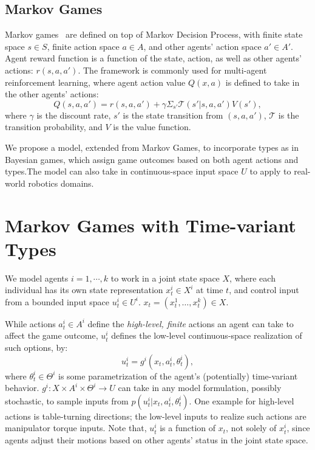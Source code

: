 \documentclass[letterpaper, 10 pt, conference]{ieeeconf}  %
\begin{document}
\subsection{Markov Games}
\vspace{-.2em}
Markov games~\cite{littman1994markov} are defined on top of Markov Decision Process, with finite state space 
$s \in S$, finite action space $a \in A$, and other agents' action space 
$a' \in A'$.  Agent reward 
function is a function of the state, action, as well as other agents' actions: 
$r(s,a,a')$. The framework is commonly used for multi-agent reinforcement 
learning, where agent action value $Q(x,a)$ is defined to take in the other agents' actions:
\begin{equation}
  Q(s,a,a') = r(s,a,a') + \gamma \Sigma_{s'}\mathcal{T}(s'|s,a,a')V(s'),
\end{equation}
where $\gamma$ is the discount rate, $s'$ is the state transition from 
$(s,a,a')$, $\mathcal{T}$ is the transition probability, and $V$ is the value 
function.

We propose a model, extended from Markov Games, to incorporate types as in 
Bayesian games, which assign game outcomes based on both agent actions and 
types.The model can also take in continuous-space input space $U$ to apply to real-world robotics domains. 
\section{Markov Games with Time-variant Types}
We model agents $i = 1,\cdots ,k$ to work in a joint state space $X$, where each individual has its own state 
representation $x_t^i \in X^i$ at time $t$, and control input from a bounded 
input space $u_t^i \in U^i$. $x_t = (x^1_t,\ldots,x^k_t) \in X$.

While actions $a_t^i \in A^i$ define the \textit{high-level, finite} actions an 
agent can take to affect the game outcome, $u_t^i$ defines the low-level continuous-space
realization of such options, by:
\begin{equation}\label{eq:g_function}
  u_t^i = g^i(x_t, a^i_t, \theta^i_t),
\end{equation}
where $\theta^i_t \in \Theta^i$ is some parametrization of the agent's 
(potentially) time-variant behavior.
$g^i:X \times A^i \times \Theta^i \rightarrow U$ can take in any model 
formulation, 
possibly stochastic, to sample inputs from $p(u_t^i|x_t,a^i_t,\theta_t^i)$. 
One example for high-level actions is table-turning directions; the low-level 
inputs to realize such actions are manipulator torque inputs. 
Note that, $u_t^i$ is a function of $x_t$, not solely of $x^i_t$, since agents 
adjust their motions based on other agents' status in the joint state space. 
\end{document}
